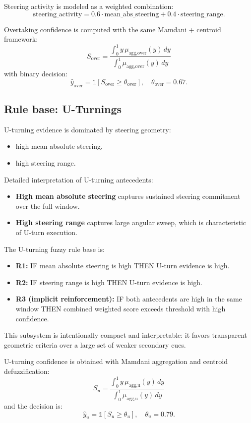 \documentclass[11pt,a4paper]{article}
\begin{document}
Steering activity is modeled as a weighted combination:
\[
\text{steering\_activity}=0.6\cdot \text{mean\_abs\_steering}+0.4\cdot \text{steering\_range}.
\]

Overtaking confidence is computed with the same Mamdani + centroid framework:
\[
S_{\text{over}}=\frac{\int_0^1 y\,\mu_{\text{agg,over}}(y)\,dy}{\int_0^1 \mu_{\text{agg,over}}(y)\,dy}
\]
with binary decision:
\[
\hat{y}_{\text{over}}=\mathbb{1}[S_{\text{over}}\ge \theta_{\text{over}}], \quad \theta_{\text{over}}=0.67.
\]

\subsection{Rule base: U-Turnings}
U-turning evidence is dominated by steering geometry:
\begin{itemize}
    \item high mean absolute steering,
    \item high steering range.
\end{itemize}

Detailed interpretation of U-turning antecedents:
\begin{itemize}
    \item \textbf{High mean absolute steering} captures sustained steering commitment over the full window.
    \item \textbf{High steering range} captures large angular sweep, which is characteristic of U-turn execution.
\end{itemize}

The U-turning fuzzy rule base is:
\begin{itemize}
    \item \textbf{R1:} IF mean absolute steering is high THEN U-turn evidence is high.
    \item \textbf{R2:} IF steering range is high THEN U-turn evidence is high.
    \item \textbf{R3 (implicit reinforcement):} IF both antecedents are high in the same window THEN combined weighted score exceeds threshold with high confidence.
\end{itemize}

This subsystem is intentionally compact and interpretable: it favors transparent geometric criteria over a large set of weaker secondary cues.

U-turning confidence is obtained with Mamdani aggregation and centroid defuzzification:
\[
S_{u}=\frac{\int_0^1 y\,\mu_{\text{agg,u}}(y)\,dy}{\int_0^1 \mu_{\text{agg,u}}(y)\,dy}
\]
and the decision is:
\[
\hat{y}_{u}=\mathbb{1}[S_{u}\ge \theta_{u}], \quad \theta_u=0.79.
\]
\end{document}
